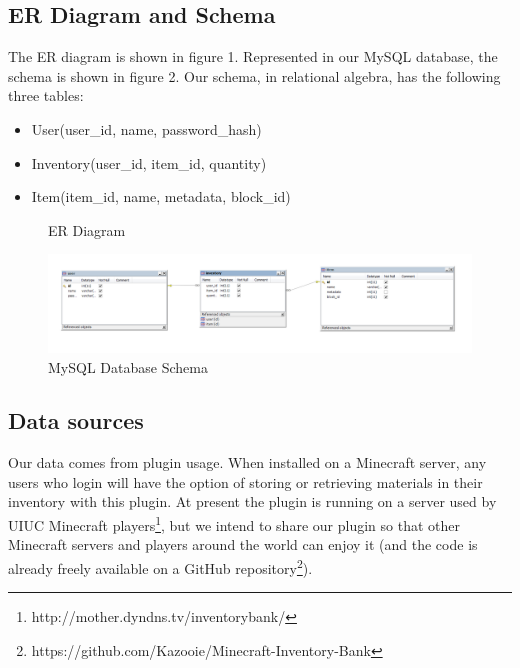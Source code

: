 \documentclass[12pt]{article}
\begin{document}
\subsection{ER Diagram and Schema}
The ER diagram is shown in figure 1. Represented in our MySQL database, the schema is shown in figure 2. Our schema, in relational algebra, has the following three tables:

\begin{itemize}
  \item User(user\_id, name, password\_hash)
  \item Inventory(user\_id, item\_id, quantity)
  \item Item(item\_id, name, metadata, block\_id)
\end{itemize}

\begin{figure}[h]
  \centerline{}
  \caption{ER Diagram}
\end{figure}

\begin{figure}[h]
  \centerline{\includegraphics[width=22cm]{db.png}}
  \caption{MySQL Database Schema}
\end{figure}

\subsection{Data sources}
Our data comes from plugin usage. When installed on a Minecraft server, any users who login will have the option of storing or retrieving materials in their inventory with this plugin. At present the plugin is running on a server used by UIUC Minecraft players\footnote{http://mother.dyndns.tv/inventorybank/}, but we intend to share our plugin so that other Minecraft servers and players around the world can enjoy it (and the code is already freely available on a GitHub repository\footnote{https://github.com/Kazooie/Minecraft-Inventory-Bank}).
\end{document}
